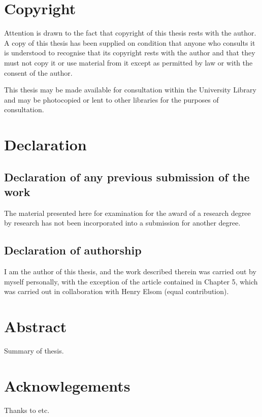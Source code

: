 \newpage


\chapter*{Copyright}

Attention is drawn to the fact that copyright of this thesis rests with the author. 
A copy of this thesis has been supplied on condition that anyone who consults it is 
understood to recognise that its copyright rests with the author and that they must 
not copy it or use material from it except as permitted by law or with the consent of the author.

This thesis may be made available for consultation within the University Library and 
may be photocopied or lent to other libraries for the purposes of consultation. 

\newpage

\chapter*{Declaration}

\section*{Declaration of any previous submission of the work}

The material presented here for examination for the award of a research degree by research 
has not been incorporated into a submission for another degree.

\section*{Declaration of authorship}

I am the author of this thesis, and the work described therein was carried out by myself personally, 
with the exception of the article contained in Chapter 5, which was carried out in collaboration with Henry Elsom (equal contribution). 

\newpage

\chapter*{Abstract}

Summary of thesis.

\newpage

\chapter*{Acknowlegements}

Thanks to etc.

\newpage

\setcounter{page}{5} %

\tableofcontents
\newpage
\listoffigures
\newpage
\listoftables

\newpage
{} %